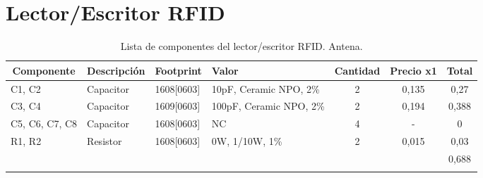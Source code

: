 \section{Lector/Escritor RFID}
\begin{longtable}{|l|p{2cm}|p{2cm}|p{2.5cm}|c|c|c|}
\hline
\multicolumn{1}{|c|}{\textbf{Componente}} & \multicolumn{1}{c|}{\textbf{Descripción}} & \textbf{ Footprint} & \textbf{Valor} & \textbf{Cantidad} & \textbf{Precio x1} & \textbf{Total} \\ \hline
C1, C2 & Capacitor & 1608[0603] & 10pF,   Ceramic NPO, 2\% & 2 & 0,135 & 0,27 \\ \hline
C3, C4 & Capacitor & 1609[0603] & 100pF, Ceramic NPO, 2\% & 2 & 0,194 & 0,388 \\ \hline
C5, C6, C7, C8 & Capacitor & 1608[0603] &  NC & 4 & - & 0 \\ \hline
R1,  R2 & Resistor & 1608[0603] & 0W,  1/10W,  1\% & 2 & 0,015 & 0,03 \\ \hline
 &  &  &  &  &  & 0,688 \\ \hline
\caption{Lista de componentes del lector/escritor RFID. Antena.}
\label{}
\end{longtable}



